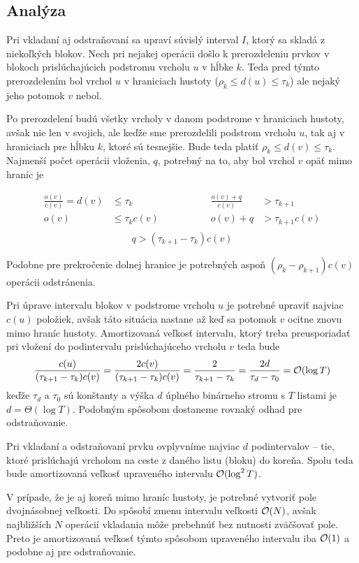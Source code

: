 \subsection{Analýza}

Pri vkladaní aj odstraňovaní sa upraví súvislý interval $I$, ktorý sa skladá z niekoľkých blokov. Nech pri nejakej operácii došlo k prerozdeleniu prvkov v blokoch prislúchajúcich podstromu vrcholu $u$ v hĺbke $k$. Teda pred týmto prerozdelením bol vrchol $u$ v hraniciach hustoty ($\rho_k \le d(u) \le \tau_k$) ale nejaký jeho potomok $v$ nebol.

Po prerozdelení budú všetky vrcholy v danom podstrome v hraniciach hustoty, avšak nie len v svojich, ale keďže sme prerozdelili podstrom vrcholu $u$, tak aj v hraniciach pre hĺbku $k$, ktoré sú tesnejšie. Bude teda platiť $\rho_k \le d(v) \le \tau_k$. Najmenší počet operácii vloženia, $q$, potrebný na to, aby bol vrchol $v$ opäť mimo hraníc je

\[
\begin{aligned}
\frac{o(v)}{c(v)} = d(v) &\le \tau_k \hspace{3cm} & \frac{o(v)+q}{c(v)} &> \tau_{k+1} \\
o(v) &\le \tau_k c(v) & o(v)+q &> \tau_{k+1}c(v) \\
\end{aligned}
\]\[
q > (\tau_{k+1}-\tau_k)c(v)
\]

Podobne pre prekročenie dolnej hranice je potrebných aspoň $(\rho_k-\rho_{k+1})c(v)$ operácii odstránenia.

Pri úprave intervalu blokov v podstrome vrcholu $u$ je potrebné upraviť najviac $c(u)$ položiek, avšak táto situácia nastane až keď sa potomok $v$ ocitne znovu mimo hraníc hustoty. Amortizovaná veľkosť intervalu, ktorý treba preusporiadať pri vložení do podintervalu prislúchajúceho vrcholu $v$ teda bude
\[
\frac{c(u)}{(\tau_{k+1}-\tau_k)c(v)} = \frac{2c(v)}{(\tau_{k+1}-\tau_k)c(v)} = \frac{2}{\tau_{k+1}-\tau_k} = \frac{2d}{\tau_d-\tau_0} = \mathcal{O}(\log{T})
\]
keďže $\tau_d$ a $\tau_0$ sú konštanty a výška $d$ úplného binárneho stromu s $T$ listami je $d = \Theta(\log{T})$. Podobným spôsobom dostaneme rovnaký odhad pre odstraňovanie.

Pri vkladaní a odstraňovaní prvku ovplyvníme najviac $d$ podintervalov -- tie, ktoré prislúchajú vrcholom na ceste z daného listu (bloku) do koreňa. Spolu teda bude amortizovaná veľkosť upraveného intervalu $\mathcal{O}(\log^2{T})$.

V prípade, že je aj koreň mimo hraníc hustoty, je potrebné vytvoriť pole dvojnásobnej veľkosti. Do spôsobí zmenu intervalu veľkosti $\mathcal{O}(N)$, avšak najbližších $N$ operácií vkladania môže prebehnúť bez nutnosti zväčšovať pole. Preto je amortizovaná veľkosť týmto spôsobom upraveného intervalu iba $\mathcal{O}(1)$ a podobne aj pre odstraňovanie.

